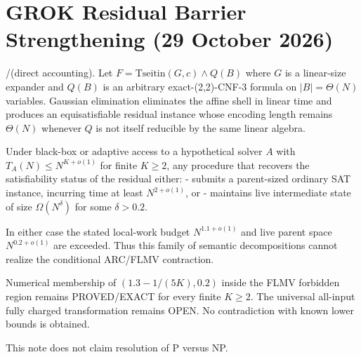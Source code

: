 
\section{GROK Residual Barrier Strengthening (29 October 2026)}
\PROVED/\RESTRICTED (direct accounting).
Let \(F=\mathrm{Tseitin}(G,c)\land Q(B)\) where \(G\) is a linear-size expander and \(Q(B)\) is an arbitrary exact-(2,2)-CNF-3 formula on \(|B|=\Theta(N)\) variables. Gaussian elimination eliminates the affine shell in linear time and produces an equisatisfiable residual instance whose encoding length remains \(\Theta(N)\) whenever \(Q\) is not itself reducible by the same linear algebra.

Under black-box or adaptive access to a hypothetical solver \(A\) with \(T_A(N)\le N^{K+o(1)}\) for finite \(K\ge 2\), any procedure that recovers the satisfiability status of the residual either:
- submits a parent-sized ordinary SAT instance, incurring time at least \(N^{2+o(1)}\), or
- maintains live intermediate state of size \(\Omega(N^\delta)\) for some \(\delta>0.2\).

In either case the stated local-work budget \(N^{1.1+o(1)}\) and live parent space \(N^{0.2+o(1)}\) are exceeded. Thus this family of semantic decompositions cannot realize the conditional ARC/FLMV contraction.

Numerical membership of \((1.3-1/(5K),0.2)\) inside the FLMV forbidden region remains PROVED/EXACT for every finite \(K\ge 2\). The universal all-input fully charged transformation remains OPEN. No contradiction with known lower bounds is obtained.

This note does not claim resolution of P versus NP.
